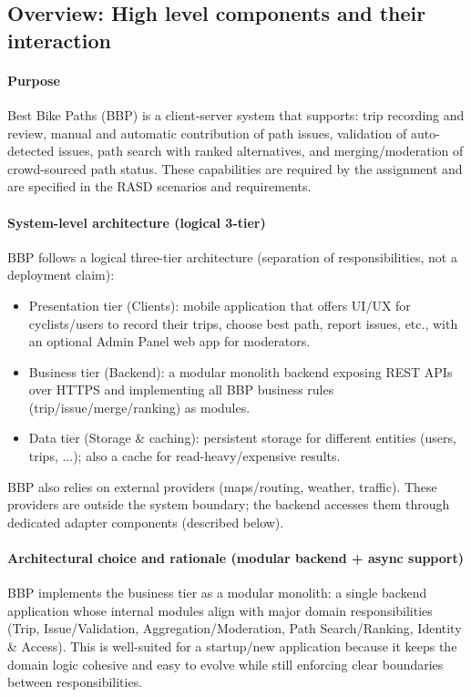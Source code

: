 \subsection{Overview: High level components and their interaction}

\paragraph{Purpose}
Best Bike Paths (BBP) is a client-server system that supports: trip recording and review, manual and automatic contribution of path issues, validation of auto-detected issues, path search with ranked alternatives, and merging/moderation of crowd-sourced path status. These capabilities are required by the assignment and are specified in the RASD scenarios and requirements.

\paragraph{System-level architecture (logical 3-tier)}
BBP follows a logical three-tier architecture (separation of responsibilities, not a deployment claim):
\begin{itemize}
	\item Presentation tier (Clients): mobile application that offers UI/UX for cyclists/users to record their trips, choose best path, report issues, etc., with an optional Admin Panel web app for moderators.
	\item Business tier (Backend): a modular monolith backend exposing REST APIs over HTTPS and implementing all BBP business rules (trip/issue/merge/ranking) as modules.
	\item Data tier (Storage \& caching): persistent storage for different entities (users, trips, ...); also a cache for read-heavy/expensive results.
\end{itemize}

BBP also relies on external providers (maps/routing, weather, traffic). These providers are outside the system boundary; the backend accesses them through dedicated adapter components (described below).

\paragraph{Architectural choice and rationale (modular backend + async support)}
BBP implements the business tier as a modular monolith: a single backend application whose internal modules align with major domain responsibilities (Trip, Issue/Validation, Aggregation/Moderation, Path Search/Ranking, Identity \& Access). This is well-suited for a startup/new application because it keeps the domain logic cohesive and easy to evolve while still enforcing clear boundaries between responsibilities.

